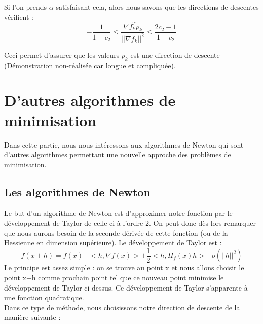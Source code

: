 Si l'on prends $\alpha$ satisfaisant cela, alors nous savons que les directions de descentes vérifient : 
\begin{equation}
-\frac{1}{1 - c_2}\leq \frac{\nabla f_k^Tp_k}{||\nabla f_k||^2} \leq \frac{2c_2 - 1}{1 - c_2}
\end{equation}

Ceci permet d'assurer que les valeurs $p_k$ est une direction de descente (Démonstration non-réalisée car longue et compliquée).
\section{D'autres algorithmes de minimisation}
Dans cette partie, nous nous intéressons aux algorithmes de Newton qui sont d'autres algorithmes permettant une nouvelle approche des problèmes de minimisation.
\subsection{Les algorithmes de Newton}
Le but d'un algorithme de Newton est d'approximer notre fonction par le développement de Taylor de celle-ci à l'ordre 2. On peut donc dès lors remarquer que nous aurons besoin de la seconde dérivée de cette fonction (ou de la Hessienne en dimension supérieure). Le développement de Taylor est  : 
\begin{equation}
f(x+h) = f(x) + <h, \nabla f(x)> + \frac{1}{2} <h, H_f(x)h> + o(||h||^2)
\end{equation}
Le principe est assez simple : on se trouve au point x et nous allons choisir le point x+h comme prochain point tel que ce nouveau point minimise le développement de Taylor ci-dessus. Ce développement de Taylor s'apparente à une fonction quadratique.\\

Dans ce type de méthode, nous choisissons notre direction de descente de la manière suivante : 

